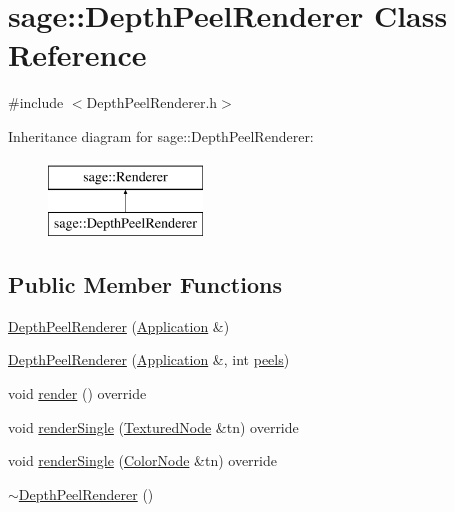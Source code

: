 \hypertarget{classsage_1_1DepthPeelRenderer}{}\section{sage\+::Depth\+Peel\+Renderer Class Reference}
\label{classsage_1_1DepthPeelRenderer}


{\ttfamily \#include $<$Depth\+Peel\+Renderer.\+h$>$}

Inheritance diagram for sage\+::Depth\+Peel\+Renderer\+:\begin{figure}[H]
\begin{center}
\leavevmode
\includegraphics[height=2.000000cm]{classsage_1_1DepthPeelRenderer}
\end{center}
\end{figure}
\subsection*{Public Member Functions}
\begin{DoxyCompactItemize}
\item 
\mbox{\hyperlink{classsage_1_1DepthPeelRenderer_aabc19f8da49637f4c10035ffb32910f1}{Depth\+Peel\+Renderer}} (\mbox{\hyperlink{classsage_1_1Application}{Application}} \&)
\item 
\mbox{\hyperlink{classsage_1_1DepthPeelRenderer_a82fb609830c881fc2fd77c239c811f29}{Depth\+Peel\+Renderer}} (\mbox{\hyperlink{classsage_1_1Application}{Application}} \&, int \mbox{\hyperlink{classsage_1_1DepthPeelRenderer_a4ffb28eb6faffc06f3ef8cb3c6882484}{peels}})
\item 
void \mbox{\hyperlink{classsage_1_1DepthPeelRenderer_a84443362d98ad685cac1f2558c9445ee}{render}} () override
\item 
void \mbox{\hyperlink{classsage_1_1DepthPeelRenderer_a45528a298ccddd656e0aa377bb4fc646}{render\+Single}} (\mbox{\hyperlink{classsage_1_1TexturedNode}{Textured\+Node}} \&tn) override
\item 
void \mbox{\hyperlink{classsage_1_1DepthPeelRenderer_af5414d31a754eaf5a91447e5793365a7}{render\+Single}} (\mbox{\hyperlink{classsage_1_1ColorNode}{Color\+Node}} \&tn) override
\item 
\mbox{\hyperlink{classsage_1_1DepthPeelRenderer_a25cbfc23170cda3ec170cce2e0681bcd}{$\sim$\+Depth\+Peel\+Renderer}} ()
\end{DoxyCompactItemize}
